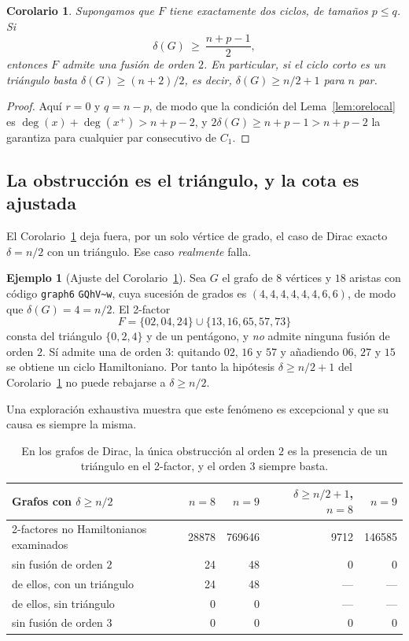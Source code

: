 \documentclass[11pt,a4paper]{article}
\newtheorem{corolario}[teorema]{Corolario}
\theoremstyle{definition}
\newtheorem{ejemplo}[teorema]{Ejemplo}
\theoremstyle{remark}
\begin{document}
\begin{corolario}\label{cor:doscicl}
Supongamos que $F$ tiene exactamente dos ciclos, de tamaños $p\le q$. Si
\[
\delta(G)\ \ge\ \frac{n+p-1}{2},
\]
entonces $F$ admite una fusión de orden $2$. En particular, si el ciclo corto es un triángulo basta $\delta(G)\ge(n+2)/2$, es decir, $\delta(G)\ge n/2+1$ para $n$ par.
\end{corolario}

\begin{proof}
Aquí $r=0$ y $q=n-p$, de modo que la condición del Lema~\ref{lem:orelocal} es $\deg(x)+\deg(x^+)>n+p-2$, y $2\delta(G)\ge n+p-1>n+p-2$ la garantiza para cualquier par consecutivo de $C_1$.
\end{proof}

\subsection{La obstrucción es el triángulo, y la cota es ajustada}

El Corolario~\ref{cor:doscicl} deja fuera, por un solo vértice de grado, el caso de Dirac exacto $\delta=n/2$ con un triángulo. Ese caso \emph{realmente} falla.

\begin{ejemplo}[Ajuste del Corolario~\ref{cor:doscicl}]\label{ej:ajuste}
Sea $G$ el grafo de $8$ vértices y $18$ aristas con código \texttt{graph6} \verb|GQhV~w|, cuya sucesión de grados es $(4,4,4,4,4,4,6,6)$, de modo que $\delta(G)=4=n/2$. El 2-factor
\[
F=\{02,04,24\}\cup\{13,16,65,57,73\}
\]
consta del triángulo $\{0,2,4\}$ y de un pentágono, y \emph{no} admite ninguna fusión de orden $2$. Sí admite una de orden $3$: quitando $02$, $16$ y $57$ y añadiendo $06$, $27$ y $15$ se obtiene un ciclo Hamiltoniano. Por tanto la hipótesis $\delta\ge n/2+1$ del Corolario~\ref{cor:doscicl} no puede rebajarse a $\delta\ge n/2$.
\end{ejemplo}

Una exploración exhaustiva muestra que este fenómeno es excepcional y que su causa es siempre la misma.

\begin{table}[h]
\centering
\begin{tabular}{lrrrr}
\toprule
Grafos con $\delta\ge n/2$ & $n=8$ & $n=9$ & $\delta\ge n/2+1$, $n=8$ & $n=9$\\
\midrule
2-factores no Hamiltonianos examinados & 28878 & 769646 & 9712 & 146585\\
sin fusión de orden $2$ & 24 & 48 & 0 & 0\\
\quad de ellos, con un triángulo & 24 & 48 & --- & ---\\
\quad de ellos, sin triángulo & 0 & 0 & --- & ---\\
sin fusión de orden $3$ & 0 & 0 & 0 & 0\\
\bottomrule
\end{tabular}
\caption{En los grafos de Dirac, la única obstrucción al orden $2$ es la presencia de un triángulo en el 2-factor, y el orden $3$ siempre basta.}\label{tab:dirac}
\end{table}
\end{document}
